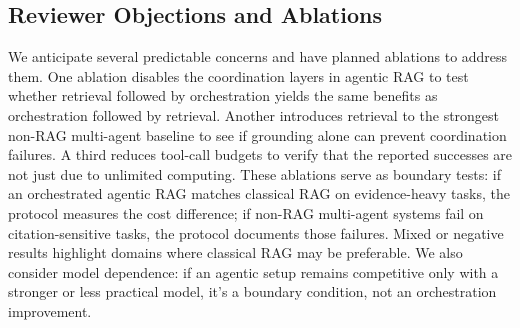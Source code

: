 \subsection{Reviewer Objections and Ablations}

We anticipate several predictable concerns and have planned ablations to address them. One ablation disables the coordination layers in agentic RAG to test whether retrieval followed by orchestration yields the same benefits as orchestration followed by retrieval. Another introduces retrieval to the strongest non-RAG multi-agent baseline to see if grounding alone can prevent coordination failures. A third reduces tool-call budgets to verify that the reported successes are not just due to unlimited computing. These ablations serve as boundary tests: if an orchestrated agentic RAG matches classical RAG on evidence-heavy tasks, the protocol measures the cost difference; if non-RAG multi-agent systems fail on citation-sensitive tasks, the protocol documents those failures. Mixed or negative results highlight domains where classical RAG may be preferable. We also consider model dependence: if an agentic setup remains competitive only with a stronger or less practical model, it's a boundary condition, not an orchestration improvement. 
